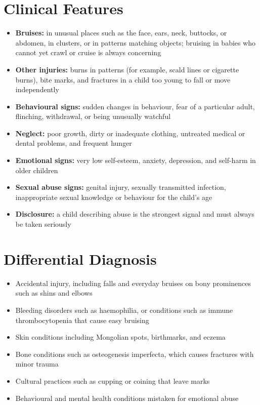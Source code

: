 \section*{Clinical Features}
\begin{itemize}
    \item \textbf{Bruises:} in unusual places such as the face, ears, neck, buttocks, or abdomen, in clusters, or in patterns matching objects; bruising in babies who cannot yet crawl or cruise is always concerning
    \item \textbf{Other injuries:} burns in patterns (for example, scald lines or cigarette burns), bite marks, and fractures in a child too young to fall or move independently
    \item \textbf{Behavioural signs:} sudden changes in behaviour, fear of a particular adult, flinching, withdrawal, or being unusually watchful
    \item \textbf{Neglect:} poor growth, dirty or inadequate clothing, untreated medical or dental problems, and frequent hunger
    \item \textbf{Emotional signs:} very low self-esteem, anxiety, depression, and self-harm in older children
    \item \textbf{Sexual abuse signs:} genital injury, sexually transmitted infection, inappropriate sexual knowledge or behaviour for the child's age
    \item \textbf{Disclosure:} a child describing abuse is the strongest signal and must always be taken seriously
\end{itemize}

\section*{Differential Diagnosis}
\begin{itemize}
    \item Accidental injury, including falls and everyday bruises on bony prominences such as shins and elbows
    \item Bleeding disorders such as haemophilia, or conditions such as immune thrombocytopenia that cause easy bruising
    \item Skin conditions including Mongolian spots, birthmarks, and eczema
    \item Bone conditions such as osteogenesis imperfecta, which causes fractures with minor trauma
    \item Cultural practices such as cupping or coining that leave marks
    \item Behavioural and mental health conditions mistaken for emotional abuse
\end{itemize}

